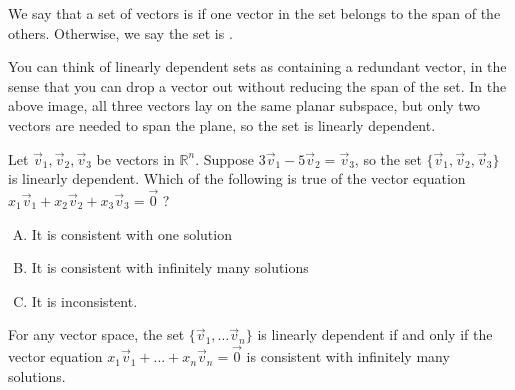 \begin{definition}
  We say that a set of vectors is  if one vector
  in the set belongs to the span of the others. Otherwise, we say the set
  is .

  \begin{center}
  \end{center}

  You can think of linearly dependent sets as containing a redundant vector,
  in the sense that you can drop a vector out without reducing the span of the set. In the above image, all three vectors lay on the same planar subspace,
  but only two vectors are needed to span the plane, so the set is
  linearly dependent.
\end{definition}

\begin{activity}{10}
  Let \(\vec{v}_1,\vec{v}_2,\vec{v}_3 \) be vectors in \(\mathbb R^n\).
  Suppose \(3\vec{v}_1-5\vec{v}_2=\vec{v}_3\), so the set
  \(\{\vec{v}_1,\vec{v}_2,\vec{v}_3\}\) is linearly dependent.
  Which of the following is true of the vector equation \(x_1\vec{v}_1+x_2\vec{v}_2+x_3\vec{v}_3=\vec{0}\) ?
  \begin{enumerate}[(A)]
  \item It is consistent with one solution
  \item It is consistent with infinitely many solutions
  \item It is inconsistent.
  \end{enumerate}
\end{activity}

\begin{fact}
  For any vector space,
  the set \(\{\vec v_1,\dots\vec v_n\}\) is linearly dependent if and only
  if the vector equation \(x_1\vec v_1+\dots+x_n\vec v_n=\vec{0}\) is consistent with
  infinitely many solutions.
\end{fact}

